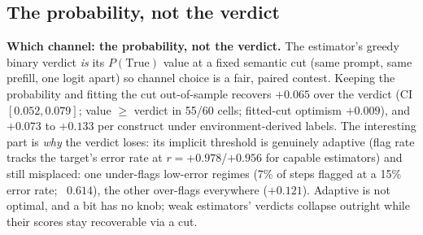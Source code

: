 \documentclass{article}
\newcommand{\ptrue}{P(\text{True})}
\newcommand{\ba}{\text{BA}}
\begin{document}
\subsection{The probability, not the verdict}
\textbf{Which channel: the probability, not the verdict.} The estimator's
greedy binary verdict \emph{is} its $\ptrue$ value at a fixed semantic cut (same prompt, same prefill, one logit apart) so channel choice is a fair,
paired contest. Keeping the probability and fitting the cut out-of-sample
recovers $+0.065$ \ba over the verdict (CI $[0.052, 0.079]$; value $\geq$
verdict in 55/60 cells; fitted-cut optimism $+0.009$), and $+0.073$ to
$+0.133$ per construct under environment-derived labels. The interesting part is \emph{why}
the verdict loses: its implicit threshold is genuinely adaptive (flag rate
tracks the target's error rate at $r = +0.978$/$+0.956$ for capable
estimators) and still misplaced: one under-flags low-error regimes (7\% of
steps flagged at a 15\% error rate; \ba\ $0.614$), the other over-flags
everywhere ($+0.121$). Adaptive is not optimal, and a bit has no knob; weak estimators' verdicts
collapse outright while their scores stay recoverable via a cut.
\end{document}
